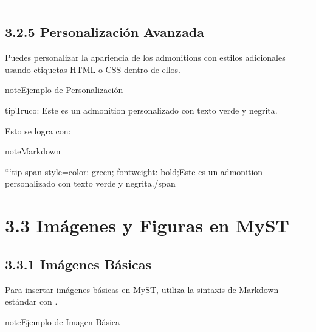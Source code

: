 \documentclass[a4paper,10pt,spanish]{sphinxmanual}
\begin{document}
\bigskip\hrule\bigskip



\subsection{3.2.5 Personalización Avanzada}
\label{\detokenize{3_guia_myst/advertencias:personalizacion-avanzada}}
\sphinxAtStartPar
Puedes personalizar la apariencia de los admonitions con estilos adicionales usando etiquetas HTML o CSS dentro de ellos.

\begin{sphinxadmonition}{note}{Ejemplo de Personalización}

\begin{sphinxadmonition}{tip}{Truco:}
\sphinxAtStartPar
Este es un admonition personalizado con texto verde y negrita.
\end{sphinxadmonition}
\end{sphinxadmonition}

\sphinxAtStartPar
Esto se logra con:

\begin{sphinxadmonition}{note}{Markdown}

\begin{sphinxVerbatim}[commandchars=\\\{\}]
```\PYGZob{}tip\PYGZcb{}
\PYGZlt{}span style=\PYGZdq{}color: green; font\PYGZhy{}weight: bold;\PYGZdq{}\PYGZgt{}Este es un admonition personalizado con texto verde y negrita.\PYGZlt{}/span\PYGZgt{}
\end{sphinxVerbatim}
\end{sphinxadmonition}

\sphinxstepscope


\section{3.3 Imágenes y Figuras en MyST}
\label{\detokenize{3_guia_myst/imagenes_figuras:imagenes-y-figuras-en-myst}}\label{\detokenize{3_guia_myst/imagenes_figuras::doc}}

\subsection{3.3.1 Imágenes Básicas}
\label{\detokenize{3_guia_myst/imagenes_figuras:imagenes-basicas}}
\sphinxAtStartPar
Para insertar imágenes básicas en MyST, utiliza la sintaxis de Markdown estándar con \sphinxcode{\sphinxupquote{!{[}{]}()}}.

\begin{sphinxadmonition}{note}{Ejemplo de Imagen Básica}

\sphinxAtStartPar
{}
\end{sphinxadmonition}
\end{document}
